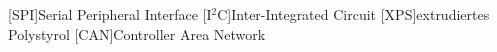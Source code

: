 
\begin{acronym}[ACRONYM]
[SPI]{Serial Peripheral Interface}
[I$^2$C]{Inter-Integrated Circuit}
[XPS]{extrudiertes Polystyrol}
[CAN]{Controller Area Network}
\end{acronym}\newpage

